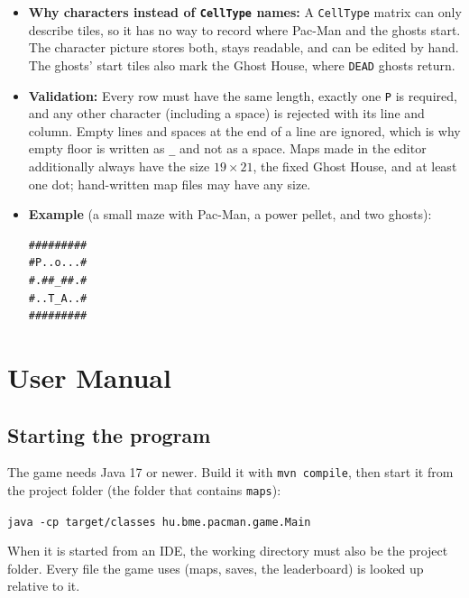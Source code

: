 \documentclass[11pt, a4paper]{article}
\begin{document}
\begin{itemize}
    \item \textbf{Why characters instead of \texttt{CellType} names:} A \texttt{CellType} matrix can only describe tiles, so it has no way to record where Pac-Man and the ghosts start. The character picture stores both, stays readable, and can be edited by hand. The ghosts' start tiles also mark the Ghost House, where \texttt{DEAD} ghosts return.
    \item \textbf{Validation:} Every row must have the same length, exactly one \texttt{P} is required, and any other character (including a space) is rejected with its line and column. Empty lines and spaces at the end of a line are ignored, which is why empty floor is written as \texttt{\_} and not as a space. Maps made in the editor additionally always have the size $19 \times 21$, the fixed Ghost House, and at least one dot; hand-written map files may have any size.
    \item \textbf{Example} (a small maze with Pac-Man, a power pellet, and two ghosts):

    \vspace{0.1cm}
\begin{verbatim}
#########
#P..o...#
#.##_##.#
#..T_A..#
#########
\end{verbatim}
\end{itemize}

\clearpage

\section{User Manual}
\label{sec:manual}

\subsection*{Starting the program}
The game needs Java 17 or newer. Build it with \texttt{mvn compile}, then start it from the project folder (the folder that contains \texttt{maps}):

\vspace{0.1cm}
\texttt{java -cp target/classes hu.bme.pacman.game.Main}
\vspace{0.1cm}

When it is started from an IDE, the working directory must also be the project folder. Every file the game uses (maps, saves, the leaderboard) is looked up relative to it.
\end{document}
